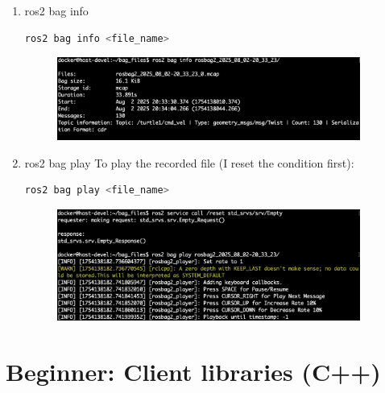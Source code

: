 \documentclass[12pt, a4paper]{article}
\begin{document}
\begin{enumerate}
\newpage
\item ros2 bag info
\begin{lstlisting}[language=bash]
ros2 bag info <file_name>
\end{lstlisting}
\begin{figure}[h]
	\setlength{\leftskip}{2.4em}
	\includegraphics[width=0.94\textwidth]{p1.10-2}
\end{figure}

\item ros2 bag play
To play the recorded file (I reset the condition first):
\begin{lstlisting}[language=bash]
ros2 bag play <file_name>
\end{lstlisting}
\begin{figure}[h]
	\setlength{\leftskip}{2.4em}
	\includegraphics[width=0.94\textwidth]{p1.10-3}
\end{figure}
\end{enumerate}

\newpage
\section{Beginner: Client libraries (C++)}
\end{document}
